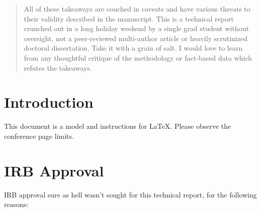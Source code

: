 \documentclass[10]{article}
\begin{document}
\begin{abstract}
All of these takeaways are couched in caveats and have various threats to their validity described in the manuscript. This is a technical report crunched out in a long holiday weekend by a single grad student without oversight, not a peer-reviewed multi-author article or heavily scrutinized doctoral dissertation. Take it with a grain of salt. I would love to learn from any thoughtful critique of the methodology or fact-based data which refutes the takeaways.
\end{abstract}


\section{Introduction}
This document is a model and instructions for \LaTeX.
Please observe the conference page limits.

\section{IRB Approval}
IRB approval sure as hell wasn't sought for this technical report, for the following reasons:
\end{document}

